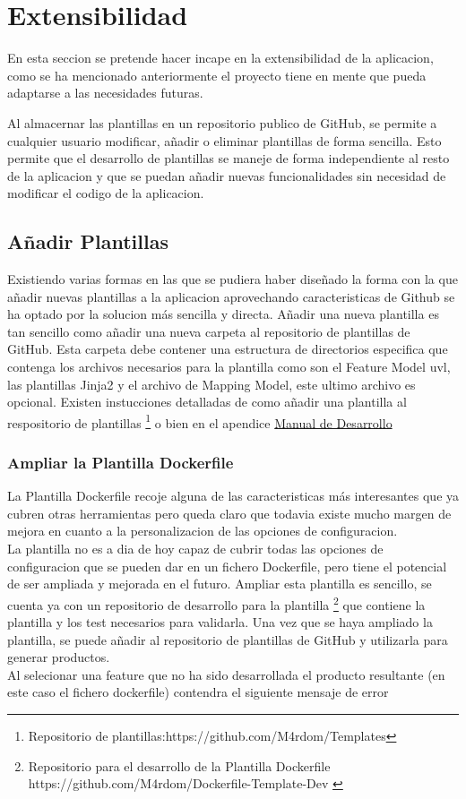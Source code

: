 \documentclass[12pt, a4paper, twoside]{article}
\begin{document}
\section{Extensibilidad}
\label{sec:Extensibilidad}
En esta seccion se pretende hacer incape en la extensibilidad de la aplicacion, como se ha mencionado anteriormente el proyecto tiene en mente que pueda adaptarse a las necesidades futuras.

Al almacernar las plantillas en un repositorio publico de GitHub, se permite a cualquier usuario modificar, añadir o eliminar plantillas de forma sencilla.
Esto permite que el desarrollo de plantillas se maneje de forma independiente al resto de la aplicacion y que se puedan añadir nuevas funcionalidades sin necesidad de modificar el codigo de la aplicacion.
\subsection{Añadir Plantillas}
Existiendo varias formas en las que se pudiera haber diseñado la forma con la que añadir nuevas plantillas a la aplicacion aprovechando caracteristicas de Github se ha optado por la solucion más sencilla y directa.
Añadir una nueva plantilla es tan sencillo como añadir una nueva carpeta al repositorio de plantillas de GitHub.
Esta carpeta debe contener una estructura de directorios especifica que contenga los archivos necesarios para la plantilla como son el Feature Model uvl, las plantillas Jinja2 y el archivo de Mapping Model, este ultimo archivo es opcional.
Existen instucciones detalladas de como añadir una plantilla al respositorio de plantillas \footnote{Repositorio de plantillas:https://github.com/M4rdom/Templates} o bien en el apendice \hyperref[sec:Manual de Desarrollo]{Manual de Desarrollo}

\newpage

\subsubsection{Ampliar la Plantilla Dockerfile}
La Plantilla Dockerfile recoje alguna de las caracteristicas más interesantes que ya cubren otras herramientas pero queda claro que todavia existe mucho margen de mejora en cuanto a la personalizacion de las opciones de configuracion.
\\La plantilla no es a dia de hoy capaz de cubrir todas las opciones de configuracion que se pueden dar en un fichero Dockerfile, pero tiene el potencial de ser ampliada y mejorada en el futuro.
Ampliar esta plantilla es sencillo, se cuenta ya con un repositorio de desarrollo para la plantilla \footnote{Repositorio para el desarrollo de la Plantilla Dockerfile https://github.com/M4rdom/Dockerfile-Template-Dev \cite{dockerfile_template_dev}} que contiene la plantilla y los test necesarios para validarla.
Una vez que se haya ampliado la plantilla, se puede añadir al repositorio de plantillas de GitHub y utilizarla para generar productos.
\\Al selecionar una feature que no ha sido desarrollada el producto resultante (en este caso el fichero dockerfile) contendra el siguiente mensaje de error
\end{document}

